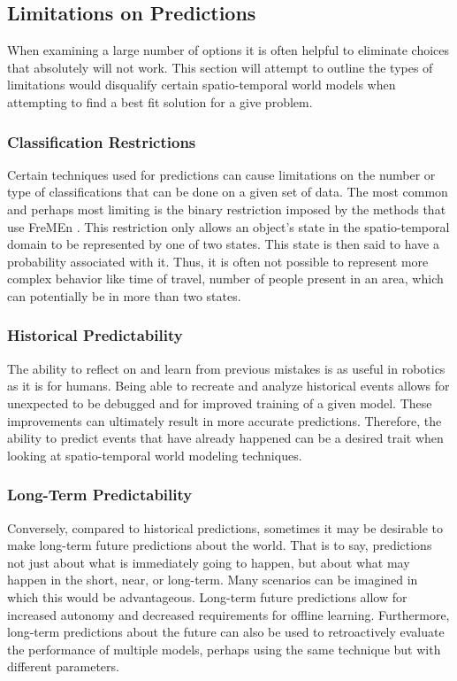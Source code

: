   \subsection { Limitations on Predictions }
  When examining a large number of options it is often helpful to eliminate
  choices that absolutely will not work. This section will attempt to outline
  the types of limitations would disqualify certain spatio-temporal world
  models when attempting to find a best fit solution for a give problem. \\


  \subsubsection{ Classification Restrictions }
  Certain techniques used for predictions can cause limitations on the number
  or type of classifications that can be done on a given set of data. The most common
  and perhaps most limiting is the binary restriction imposed by the
  methods that use FreMEn \cite{Krajnik2015} \cite{Hawes2017}. This restriction only
  allows an object's state in the spatio-temporal domain to be represented by one of two
  states. This state is then said to have a probability associated with it.
  Thus, it is often not possible to represent more complex behavior like time
  of travel, number of people present in an area, which can potentially be in
  more than two states. \\

  \subsubsection{ Historical Predictability }
  The ability to reflect on and learn from previous mistakes is as useful in
  robotics as it is for humans. Being able to recreate and analyze historical
  events allows for unexpected to be debugged and for
  improved training of a given model. These improvements can ultimately result
  in more accurate predictions. Therefore, the ability to predict events that
  have already happened can be a desired trait when looking at
  spatio-temporal world modeling techniques. \\

  \subsubsection{ Long-Term Predictability }
  Conversely, compared to historical predictions, sometimes it may be desirable
  to make long-term future predictions about the world. That is to say, predictions
  not just about what is immediately going to happen, but about what may happen
  in the short, near, or long-term. Many scenarios can be imagined
  in which this would be advantageous. Long-term future predictions allow for
  increased autonomy and decreased requirements for offline learning.
  Furthermore, long-term predictions about the future can also be used to
  retroactively evaluate the performance of multiple models, perhaps using
  the same technique but with different parameters. \\


